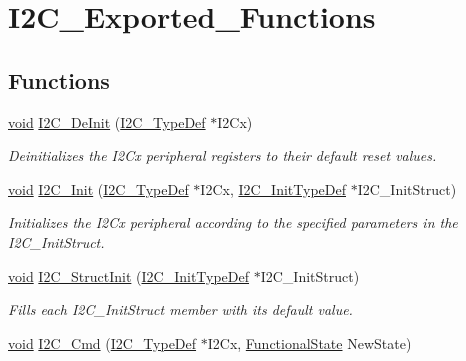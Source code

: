 \hypertarget{group___i2_c___exported___functions}{}\section{I2\+C\+\_\+\+Exported\+\_\+\+Functions}
\label{group___i2_c___exported___functions}
\subsection*{Functions}
\begin{DoxyCompactItemize}
\item 
\hyperlink{usb__devapi_8h_afabf60e7f57651d6d595a02c75f07cd0}{void} \hyperlink{group___i2_c___exported___functions_ga2ee214364603059ad5d9089f749f5bfd}{I2\+C\+\_\+\+De\+Init} (\hyperlink{struct_i2_c___type_def}{I2\+C\+\_\+\+Type\+Def} $\ast$I2\+Cx)
\begin{DoxyCompactList}\small\item\em Deinitializes the I2\+Cx peripheral registers to their default reset values. \end{DoxyCompactList}\item 
\hyperlink{usb__devapi_8h_afabf60e7f57651d6d595a02c75f07cd0}{void} \hyperlink{group___i2_c___exported___functions_gaac29465bca70fbc91c2f922ab67bb88e}{I2\+C\+\_\+\+Init} (\hyperlink{struct_i2_c___type_def}{I2\+C\+\_\+\+Type\+Def} $\ast$I2\+Cx, \hyperlink{struct_i2_c___init_type_def}{I2\+C\+\_\+\+Init\+Type\+Def} $\ast$I2\+C\+\_\+\+Init\+Struct)
\begin{DoxyCompactList}\small\item\em Initializes the I2\+Cx peripheral according to the specified parameters in the I2\+C\+\_\+\+Init\+Struct. \end{DoxyCompactList}\item 
\hyperlink{usb__devapi_8h_afabf60e7f57651d6d595a02c75f07cd0}{void} \hyperlink{group___i2_c___exported___functions_ga08582aca6d7d7910cd5cbff0d9def350}{I2\+C\+\_\+\+Struct\+Init} (\hyperlink{struct_i2_c___init_type_def}{I2\+C\+\_\+\+Init\+Type\+Def} $\ast$I2\+C\+\_\+\+Init\+Struct)
\begin{DoxyCompactList}\small\item\em Fills each I2\+C\+\_\+\+Init\+Struct member with its default value. \end{DoxyCompactList}\item 
\hyperlink{usb__devapi_8h_afabf60e7f57651d6d595a02c75f07cd0}{void} \hyperlink{group___i2_c___exported___functions_ga7e1323c9133c2cb424dfb5b10b7d2f0b}{I2\+C\+\_\+\+Cmd} (\hyperlink{struct_i2_c___type_def}{I2\+C\+\_\+\+Type\+Def} $\ast$I2\+Cx, \hyperlink{agilefox_2library_2inc_2stm32f10x__type_8h_ac9a7e9a35d2513ec15c3b537aaa4fba1}{Functional\+State} New\+State)

\end{DoxyCompactItemize}
